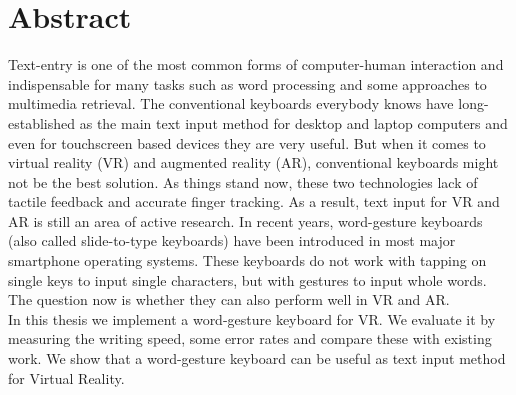 \chapter{Abstract}
Text-entry is one of the most common forms of computer-human interaction and indispensable for many tasks such as word processing and some approaches to multimedia retrieval. The conventional keyboards everybody knows have long-established as the main text input method for desktop and laptop computers and even for touchscreen based devices they are very useful. But when it comes to virtual reality (VR) and augmented reality (AR), conventional keyboards might not be the best solution. As things stand now, these two technologies lack of tactile feedback and accurate finger tracking. As a result, text input for VR and AR is still an area of active research. In recent years, word-gesture keyboards (also called slide-to-type keyboards) have been introduced in most major smartphone operating systems. These keyboards do not work with tapping on single keys to input single characters, but with gestures to input whole words. The question now is whether they can also perform well in VR and AR.\\
In this thesis we implement a word-gesture keyboard for VR. We evaluate it by measuring the writing speed, some error rates and compare these with existing work. We show that a word-gesture keyboard can be useful as text input method for Virtual Reality.